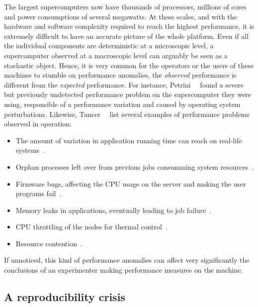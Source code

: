             The largest supercomputers now have thousands of processors, millions of cores and power consumptions of several
            megawatts. At these scales, and with the hardware and software complexity required to reach the highest
            performance, it is extremely difficult to have an accurate picture of the whole platform. Even if all the
            individual components are deterministic at a microscopic level, a supercomputer observed at a macroscopic level
            can arguably be seen as a stochastic object. Hence, it is very common for the operators or the users of these
            machines to stumble on performance anomalies, \ie the \emph{observed} performance is different from the
            \emph{expected} performance. For instance, Petrini~\etal~\cite{Petrini_2003} found a severe but previously
            undetected performance problem on the supercomputer they were using, responsible of a 
            performance variation and caused by operating system perturbations. Likewise,
            Tuncer~\etal~\cite[Section~1]{Tuncer_2017} list several examples of performance problems observed in operation:
            \begin{itemize}
                \item The amount of variation in application running time can reach  on real-life
                    systems~\cite{Bhatele_2013,Skinner}.
                \item Orphan processes left over from previous jobs consumming system resources~\cite{Brandt_2010}.
                \item Firmware bugs, affecting the CPU usage on the server and making the user programs
                    fail~\cite{cisco_bug}.
                \item Memory leaks in applications, eventually leading to job failure~\cite{Agelastos_2015}.
                \item CPU throttling of the nodes for thermal control~\cite{Brandt2015EnablingAO}.
                \item Resource contention~\cite{Bhatele_2013,dorier:hal-00916091}.
            \end{itemize}
            If unnoticed, this kind of performance anomalies can affect very significantly the conclusions of an
            experimenter making performance measures on the machine.

        \subsection{A reproducibility crisis}%
        \label{sub:reproducibility_crisis}

